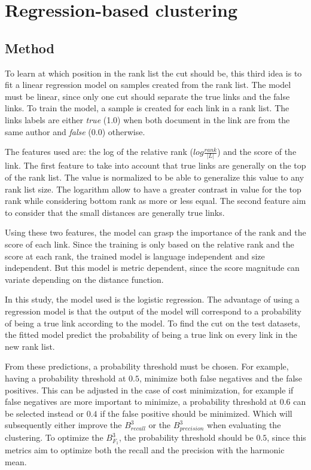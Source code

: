 \section{Regression-based clustering\label{sec:regression_based_clustering}}

\subsection{Method}

To learn at which position in the rank list the cut should be, this third idea is to fit a linear regression model on samples created from the rank list.
The model must be linear, since only one cut should separate the true links and the false links.
To train the model, a sample is created for each link in a rank list.
The links labels are either \textit{true} (1.0) when both document in the link are from the same author and \textit{false} (0.0) otherwise.

The features used are: the log of the relative rank ($log \frac{rank}{|L|}$) and the score of the link.
The first feature to take into account that true links are generally on the top of the rank list.
The value is normalized to be able to generalize this value to any rank list size.
The logarithm allow to have a greater contrast in value for the top rank while considering bottom rank as more or less equal.
The second feature aim to consider that the small distances are generally true links.

Using these two features, the model can grasp the importance of the rank and the score of each link.
Since the training is only based on the relative rank and the score at each rank, the trained model is language independent and size independent.
But this model is metric dependent, since the score magnitude can variate depending on the distance function.

In this study, the model used is the logistic regression.
The advantage of using a regression model is that the output of the model will correspond to a probability of being a true link according to the model.
To find the cut on the test datasets, the fitted model predict the probability of being a true link on every link in the new rank list.

From these predictions, a probability threshold must be chosen.
For example, having a probability threshold at $0.5$, minimize both false negatives and the false positives.
This can be adjusted in the case of cost minimization, for example if false negatives are more important to minimize, a probability threshold at $0.6$ can be selected instead or $0.4$ if the false positive should be minimized.
Which will subsequently either improve the $B^3_{recall}$ or the $B^3_{precision}$ when evaluating the clustering.
To optimize the $B^3_{F_1}$, the probability threshold should be $0.5$, since this metrics aim to optimize both the recall and the precision with the harmonic mean.

